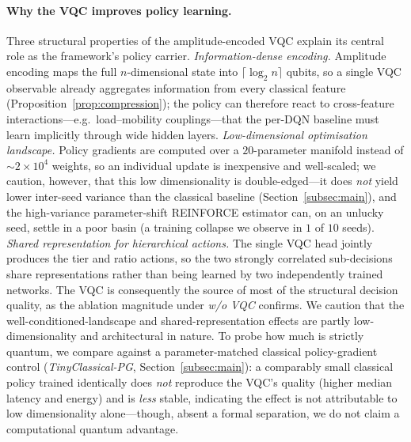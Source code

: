 \documentclass[11pt,a4paper]{article}
\theoremstyle{definition}
\begin{document}
\paragraph{Why the VQC improves policy learning.}
Three structural properties of the amplitude-encoded VQC explain its central role as the framework's policy carrier. \emph{Information-dense encoding.} Amplitude encoding maps the full $n$-dimensional state into $\lceil\log_2 n\rceil$ qubits, so a single VQC observable already aggregates information from every classical feature (Proposition~\ref{prop:compression}); the policy can therefore react to cross-feature interactions---e.g.\ load--mobility couplings---that the per-DQN baseline must learn implicitly through wide hidden layers. \emph{Low-dimensional optimisation landscape.} Policy gradients are computed over a $20$-parameter manifold instead of $\sim$$2\!\times\!10^{4}$ weights, so an individual update is inexpensive and well-scaled; we caution, however, that this low dimensionality is double-edged---it does \emph{not} yield lower inter-seed variance than the classical baseline (Section~\ref{subsec:main}), and the high-variance parameter-shift REINFORCE estimator can, on an unlucky seed, settle in a poor basin (a training collapse we observe in $1$ of $10$ seeds). \emph{Shared representation for hierarchical actions.} The single VQC head jointly produces the tier and ratio actions, so the two strongly correlated sub-decisions share representations rather than being learned by two independently trained networks. The VQC is consequently the source of most of the structural decision quality, as the ablation magnitude under \emph{w/o VQC} confirms. We caution that the well-conditioned-landscape and shared-representation effects are partly low-dimensionality and architectural in nature. To probe how much is strictly quantum, we compare against a parameter-matched classical policy-gradient control (\emph{TinyClassical-PG}, Section~\ref{subsec:main}): a comparably small classical policy trained identically does \emph{not} reproduce the VQC's quality (higher median latency and energy) and is \emph{less} stable, indicating the effect is not attributable to low dimensionality alone---though, absent a formal separation, we do not claim a computational quantum advantage.
\end{document}
